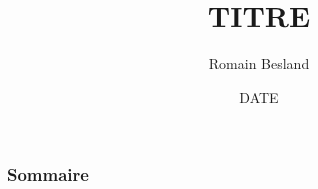 \documentclass[handout]{beamer}
\title[SUBSTITUT TITRE]{TITRE}
\author{Romain Besland}
\institute[SUBSTITUT INSTUTUTE]{INSTITUTE}
\date{DATE}
\let\otp\titlepage
\renewcommand{\titlepage}{\otp\addtocounter{framenumber}{-2}}
\begin{document}
\begin{frame}[plain]
\titlepage
\end{frame}

\begin{frame}
\frametitle{Sommaire}
\tableofcontents
\end{frame}
\end{document}
